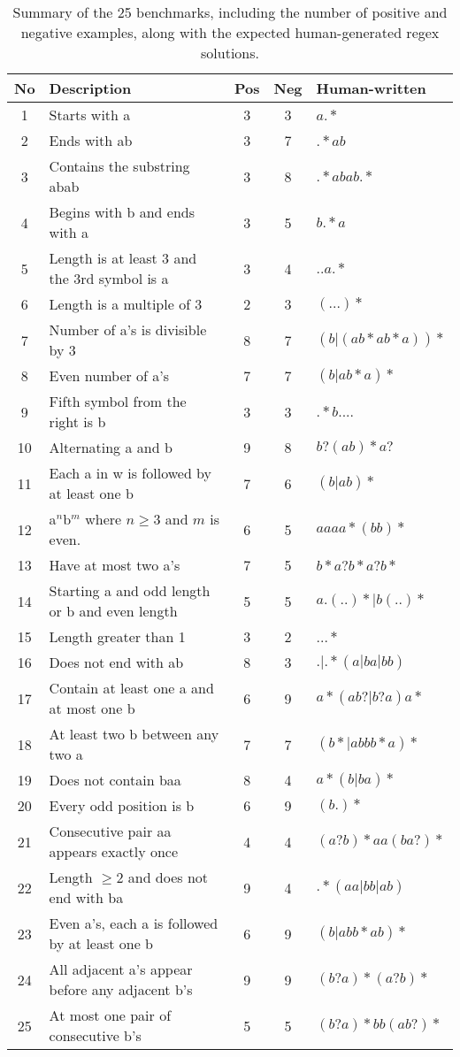\begin{table}[h!]
	\centering
	\label{tab:alpha_regex_benchmarks_summary}
	\caption{Summary of the 25 benchmarks, including the number of positive and negative examples, along with the expected human-generated regex solutions.}
	\begin{tabular}{|c|l|c|c|l|}
	\hline
	\textbf{No} & \textbf{Description} & \textbf{Pos} & \textbf{Neg} & \textbf{Human-written} \\
	\hline
	1 & Starts with a & 3 & 3 & $a.*$ \\
	2 & Ends with ab & 3 & 7 & $.*ab$ \\
	3 & Contains the substring abab & 3 & 8 & $.*abab.*$ \\
	4 & Begins with b and ends with a & 3 & 5 & $b.*a$ \\
	5 & Length is at least 3 and the 3rd symbol is a & 3 & 4 & $..a.*$ \\
	6 & Length is a multiple of 3 & 2 & 3 & $(...)*$ \\
	7 & Number of a's is divisible by 3 & 8 & 7 & $(b|(ab*ab*a))*$ \\
	8 & Even number of a's & 7 & 7 & $(b|ab*a)*$ \\
	9 & Fifth symbol from the right is b & 3 & 3 & $.*b....$ \\
	10 & Alternating a and b & 9 & 8 & $b?(ab)*a?$ \\
	11 & Each a in w is followed by at least one b & 7 & 6 & $(b|ab)*$ \\
	12 & a$^n$b$^m$ where $n \geq 3$ and $m$ is even. & 6 & 5 & $aaaa*(bb)*$ \\
	13 & Have at most two a's & 7 & 5 & $b*a?b*a?b*$ \\
	14 & Starting a and odd length or b and even length & 5 & 5 & $a.(..)*|b(..)*$ \\
	15 & Length greater than 1 & 3 & 2 & $...*$ \\
	16 & Does not end with ab & 8 & 3 & $.|.*(a|ba|bb)$ \\
	17 & Contain at least one a and at most one b & 6 & 9 & $a*(ab?|b?a)a*$ \\
	18 & At least two b between any two a & 7 & 7 & $(b*|abbb*a)*$ \\
	19 & Does not contain baa & 8 & 4 & $a*(b|ba)*$ \\
	20 & Every odd position is b & 6 & 9 & $(b.)*$ \\
	21 & Consecutive pair aa appears exactly once & 4 & 4 & $(a?b)*aa(ba?)*$ \\
	22 & Length $\ge 2$ and does not end with ba & 9 & 4 & $.*(aa|bb|ab)$ \\
	23 & Even a's, each a is followed by at least one b & 6 & 9 & $(b|abb*ab)*$ \\
	24 & All adjacent a's appear before any adjacent b's & 9 & 9 & $(b?a)*(a?b)*$ \\
	25 & At most one pair of consecutive b's & 5 & 5 & $(b?a)*bb(ab?)*$ \\
	\hline
\end{tabular}
\end{table}



